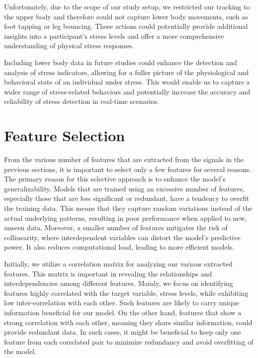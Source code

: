 Unfortunately, due to the scope of our study setup, we restricted our tracking to the upper body and therefore could not capture lower body movements, such as foot tapping or leg bouncing. These actions could potentially provide additional insights into a participant's stress levels and offer a more comprehensive understanding of physical stress responses.

Including lower body data in future studies could enhance the detection and analysis of stress indicators, allowing for a fuller picture of the physiological and behavioral state of an individual under stress. This would enable us to capture a wider range of stress-related behaviors and potentially increase the accuracy and reliability of stress detection in real-time scenarios.

\section{Feature Selection}
From the various number of features that are extracted from the signals in the previous sections, it is important to select only a few features for several reasons. The primary reason for this selective approach is to enhance the model's generalizability. Models that are trained using an excessive number of features, especially those that are less significant or redundant, have a tendency to overfit the training data. This means that they capture random variations instead of the actual underlying patterns, resulting in poor performance when applied to new, unseen data. Moreover, a smaller number of features mitigates the risk of collinearity, where interdependent variables can distort the model's predictive power. It also reduces computational load, leading to more efficient models. 

Initially, we utilize a correlation matrix for analyzing our various extracted features. This matrix is important in revealing the relationships and interdependencies among different features. Mainly, we focus on identifying features highly correlated with the target variable, stress levels, while exhibiting low inter-correlation with each other. Such features are likely to carry unique information beneficial for our model. On the other hand, features that show a strong correlation with each other, meaning they share similar information, could provide redundant data. In such cases, it might be beneficial to keep only one feature from each correlated pair to minimize redundancy and avoid overfitting of the model.

